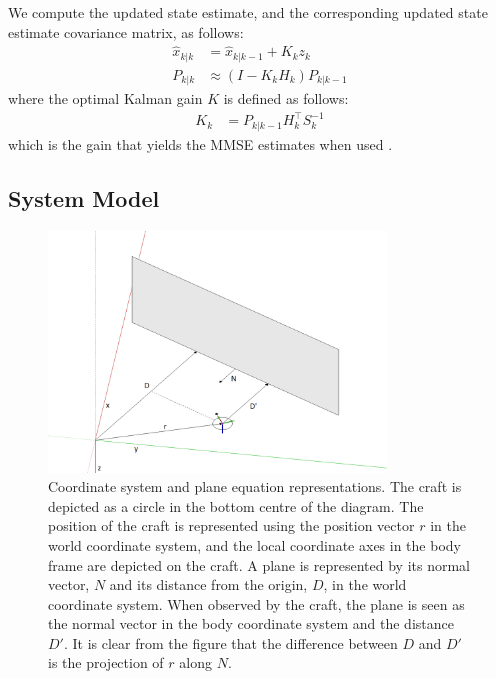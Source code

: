 \documentclass[]{article}
\begin{document}
{We compute the updated state estimate, and the corresponding updated state estimate covariance matrix, as follows:
\begin{align}
	\hat{x}_{k|k} 	&= \hat{x}_{k|k-1} + K_k z_k \\
	P_{k|k} 		&\approx (I - K_k H_k) P_{k|k-1}
\end{align}
where the optimal Kalman gain $K$ is defined as follows:
\begin{align}
	K_k &= P_{k|k-1} H_k^\top S_k^{-1}
\end{align}
which is the gain that yields the MMSE estimates when used \cite{BerkelyCourse}.


\subsection{System Model} %
\label{sub:system_model}

\begin{figure}[tb]
	\begin{center}
		\includegraphics[width=0.8\textwidth]{coordinatesystem.png}
	\end{center}
	\caption{Coordinate system and plane equation representations. The craft is depicted as a circle in the bottom centre of the diagram. The position of the craft is represented using the position vector $r$ in the world coordinate system, and the local coordinate axes in the body frame are depicted on the craft.
	A plane is represented by its normal vector, $N$ and its distance from the origin, $D$, in the world coordinate system. When observed by the craft, the plane is seen as the normal vector in the body coordinate system and the distance $D'$. It is clear from the figure that the difference between $D$ and $D'$ is the projection of $r$ along $N$.}
	\label{fig:coordinatesystem}
\end{figure}

}
\end{document}
